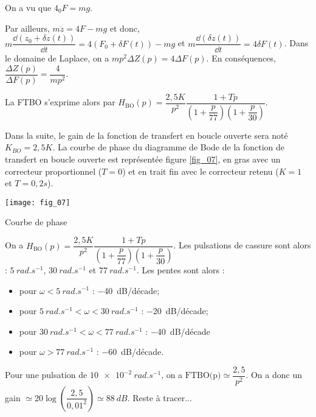 \ifprof
\begin{corrige}
On a vu que  $4 _0F = mg$. 

Par ailleurs, $ m\ddot{z} =4F-mg $ et donc, $ m\dfrac{ \dd\left( z_0+\delta z(t) \right)}{\dd t} = 4\left( F_0 + \delta F(t) \right)-mg$ et
 $ m\dfrac{ \dd\left( \delta z(t) \right)}{\dd t} = 4 \delta F(t) $. Dans le domaine de Laplace, on a 
  $ m p^2  \Delta Z(p) = 4 \Delta F(p) $. En conséquences,  
   $\dfrac{\Delta Z(p)}{\Delta F(p)} = \dfrac{4}{mp^2}$.
   
La FTBO s'exprime alors par $H_{\text{BO}}(p)=\dfrac{2,5 K}{p^2}\dfrac{1+Tp}{\left( 1+\dfrac{p}{77}\right)\left(1+\dfrac{p}{30} \right)}$.
\end{corrige}
\else
\fi

\ifprof
\else
Dans la suite, le gain de la fonction de transfert en boucle ouverte sera noté $K_{BO}=2,5 K$.
La courbe de phase du diagramme de Bode de la fonction de transfert en boucle ouverte est représentée figure \ref{fig_07}, en gras avec un correcteur proportionnel ($T=0$) et en trait fin avec le correcteur retenu ($K=1$ et $T=0,2s$).


\begin{marginfigure}[-10cm]
\texttt{[image: fig\_07]}
\caption{Courbe de phase \label{fig_07}}
\end{marginfigure}
\fi



\ifprof
\begin{corrige}
On a  $H_{\text{BO}}(p)=\dfrac{2,5 K}{p^2}\dfrac{1+Tp}{\left( 1+\dfrac{p}{77}\right)\left(1+\dfrac{p}{30} \right)}$. 
Les pulsations de cassure sont alors :  $\SI{5}{rad.s^{-1}}$, $\SI{30}{rad.s^{-1}}$ et $\SI{77}{rad.s^{-1}}$.
Les pentes sont alors : 
\begin{itemize}
\item pour $\omega<\SI{5}{rad.s^{-1}}$ : \SI{-40}{dB}/décade;
\item pour $\SI{5}{rad.s^{-1}}<\omega<\SI{30}{rad.s^{-1}}$ : \SI{-20}{dB}/décade;
\item pour $\SI{30}{rad.s^{-1}}<\omega<\SI{77}{rad.s^{-1}}$ : \SI{-40}{dB}/décade
\item pour $\omega>\SI{77}{rad.s^{-1}}$ : \SI{-60}{dB}/décade.
\end{itemize}
Pour une pulsation de $\SI{10e-2}{rad.s^{-1}}$, on a $\text{FTBO(p)}\simeq \dfrac{2,5}{p^2}$. On a donc un gain $\simeq 20\log\left(\dfrac{2,5}{0,01^2}\right) \simeq \SI{88}{dB} $.
Reste à tracer...
\end{corrige}

